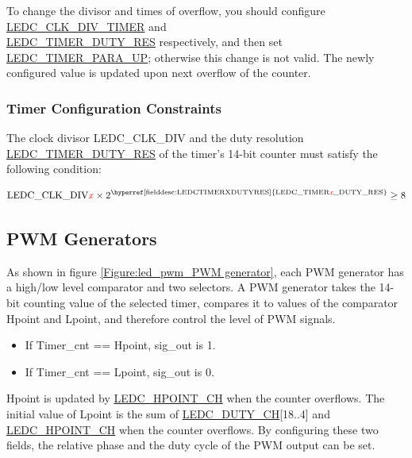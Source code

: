 \documentclass[main\_\_EN.tex]{subfiles}
\begin{document}
To change the divisor and times of overflow, you should configure \hyperref[fielddesc:LEDCCLKDIVTIMERX]{LEDC\_CLK\_DIV\_TIMER} and \\\hyperref[fielddesc:LEDCTIMERXDUTYRES]{LEDC\_TIMER\_DUTY\_RES} respectively, and then set \hyperref[fielddesc:LEDCTIMERXPARAUP]{LEDC\_TIMER\_PARA\_UP}; otherwise this change is not valid. The newly configured value is updated upon next overflow of the counter.

\subsubsection{Timer Configuration Constraints}

The clock divisor LEDC\_CLK\_DIV and the duty resolution \hyperref[fielddesc:LEDCTIMERXDUTYRES]{LEDC\_TIMER\_DUTY\_RES} of the timer's 14-bit counter must satisfy the following condition:

\begin{equation}
    {\textrm{LEDC\_CLK\_DIV}\regindex{x} \times 2^{\textrm{\hyperref[fielddesc:LEDCTIMERXDUTYRES]{LEDC\_TIMER\regindex{x}\_DUTY\_RES}}}} \ge 8
\end{equation}

\subsection{PWM Generators}\label{LEDCPWM generator}
As shown in figure \ref{Figure:led_pwm_PWM generator}, each PWM generator has a high/low level comparator and two selectors. A PWM generator takes the 14-bit counting value of the selected timer, compares it to values of the comparator Hpoint and Lpoint, and therefore control the level of PWM signals.

\begin{itemize}
\item If Timer\_cnt == Hpoint, sig\_out is 1.
\item If Timer\_cnt == Lpoint, sig\_out is 0.
\end{itemize}

Hpoint is updated by \hyperref[fielddesc:LEDCHPOINTCHN]{LEDC\_HPOINT\_CH} when the counter overflows. The initial value of Lpoint is the sum of \hyperref[fielddesc:LEDCDUTYCHN]{LEDC\_DUTY\_CH}[18..4] and \hyperref[fielddesc:LEDCHPOINTCHN]{LEDC\_HPOINT\_CH} when the counter overflows. By configuring these two fields, the relative phase and the duty cycle of the PWM output can be set.
\end{document}
